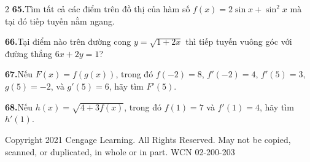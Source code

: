\begin{multicols*}{2}
\noindent\textbf{65.}\enspace Tìm tất cả các điểm trên đồ thị của hàm số $f(x) = 2 \sin x + \sin^2 x$ mà tại đó tiếp tuyến nằm ngang.\par\vspace{4pt}

\noindent\textbf{66.}\enspace Tại điểm nào trên đường cong $y = \sqrt{1 + 2x}$ thì tiếp tuyến vuông góc với đường thẳng $6x + 2y = 1$?\par\vspace{4pt}

\noindent\textbf{67.}\enspace Nếu $F(x) = f(g(x))$, trong đó $f(-2) = 8$, $f'(-2) = 4$, $f'(5) = 3$, $g(5) = -2$, và $g'(5) = 6$, hãy tìm $F'(5)$.\par\vspace{4pt}

\noindent\textbf{68.}\enspace Nếu $h(x) = \sqrt{4 + 3f(x)}$, trong đó $f(1) = 7$ và $f'(1) = 4$, hãy tìm $h'(1)$.\par

\end{multicols*}

\vfill
\begin{center}
  \fontsize{6.5}{8}\selectfont\color{gray!80!black}
  Copyright 2021 Cengage Learning. All Rights Reserved. May not be copied, scanned, or duplicated, in whole or in part. WCN 02-200-203
\end{center}
